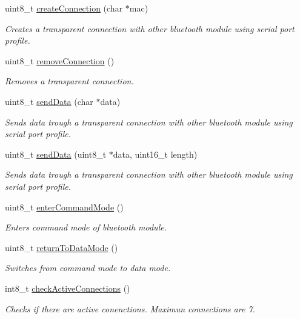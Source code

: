 \begin{DoxyCompactItemize}
uint8\+\_\+t \hyperlink{class_wasp_b_t___pro_ad95450a20c5d97e4de17b9b9fe25306d}{create\+Connection} (char $\ast$mac)
\begin{DoxyCompactList}\small\item\em Creates a transparent connection with other bluetooth module using serial port profile. \end{DoxyCompactList}\item 
uint8\+\_\+t \hyperlink{class_wasp_b_t___pro_a88f3829874a48a363caf569afb7f3d0c}{remove\+Connection} ()
\begin{DoxyCompactList}\small\item\em Removes a transparent connection. \end{DoxyCompactList}\item 
uint8\+\_\+t \hyperlink{class_wasp_b_t___pro_a94a0511c1890255911e3b2abfd6f03f7}{send\+Data} (char $\ast$data)
\begin{DoxyCompactList}\small\item\em Sends data trough a transparent connection with other bluetooth module using serial port profile. \end{DoxyCompactList}\item 
uint8\+\_\+t \hyperlink{class_wasp_b_t___pro_a9e9f5b1ce15d59060e1c82d604aa89f7}{send\+Data} (uint8\+\_\+t $\ast$data, uint16\+\_\+t length)
\begin{DoxyCompactList}\small\item\em Sends data trough a transparent connection with other bluetooth module using serial port profile. \end{DoxyCompactList}\item 
uint8\+\_\+t \hyperlink{class_wasp_b_t___pro_ace55d3a3000973394e34d9137e574eb0}{enter\+Command\+Mode} ()
\begin{DoxyCompactList}\small\item\em Enters command mode of bluetooth module. \end{DoxyCompactList}\item 
uint8\+\_\+t \hyperlink{class_wasp_b_t___pro_a2862d5f6b4e1fa1e78f4a0f091666bb8}{return\+To\+Data\+Mode} ()
\begin{DoxyCompactList}\small\item\em Switches from command mode to data mode. \end{DoxyCompactList}\item 
int8\+\_\+t \hyperlink{class_wasp_b_t___pro_a1d2e8a424ab3ae6ff1a5c845d193e8ed}{check\+Active\+Connections} ()
\begin{DoxyCompactList}\small\item\em Checks if there are active conenctions. Maximun connections are 7. \end{DoxyCompactList}\item 

\end{DoxyCompactItemize}
